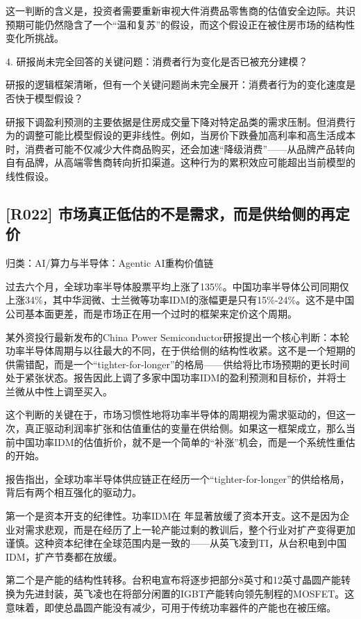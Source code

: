 \documentclass[11pt]{ctexart}
\begin{document}
这一判断的含义是，投资者需要重新审视大件消费品零售商的估值安全边际。共识预期可能仍然隐含了一个“温和复苏”的假设，而这个假设正在被住房市场的结构性变化所挑战。

4. 研报尚未完全回答的关键问题：消费者行为变化是否已被充分建模？

研报的逻辑框架清晰，但有一个关键问题尚未完全展开：消费者行为的变化速度是否快于模型假设？

研报下调盈利预测的主要依据是住房成交量下降对特定品类的需求压制。但消费行为的调整可能比模型假设的更非线性。例如，当房价下跌叠加高利率和高生活成本时，消费者可能不仅减少大件商品购买，还会加速“降级消费”——从品牌产品转向自有品牌，从高端零售商转向折扣渠道。这种行为的累积效应可能超出当前模型的线性假设。

\subsection{[R022] 市场真正低估的不是需求，而是供给侧的再定价}
{\small\color{refgray}归类：AI/算力与半导体：Agentic AI重构价值链}

过去六个月，全球功率半导体股票平均上涨了135\%。中国功率半导体公司同期仅上涨34\%，其中华润微、士兰微等功率IDM的涨幅更是只有15\%-24\%。这不是中国公司基本面更差，而是市场正在用一个过时的框架来定价这个周期。

某外资投行最新发布的China Power Semiconductor研报提出一个核心判断：本轮功率半导体周期与以往最大的不同，在于供给侧的结构性收紧。这不是一个短期的供需错配，而是一个“tighter-for-longer”的格局——供给将比市场预期的更长时间处于紧张状态。报告因此上调了多家中国功率IDM的盈利预测和目标价，并将士兰微从中性上调至买入。

这个判断的关键在于，市场习惯性地将功率半导体的周期视为需求驱动的，但这一次，真正驱动利润率扩张和估值重估的变量在供给侧。如果这一框架成立，那么当前中国功率IDM的估值折价，就不是一个简单的“补涨”机会，而是一个系统性重估的开始。

报告指出，全球功率半导体供应链正在经历一个“tighter-for-longer”的供给格局，背后有两个相互强化的驱动力。

第一个是资本开支的纪律性。功率IDM在 年显著放缓了资本开支。这不是因为企业对需求悲观，而是在经历了上一轮产能过剩的教训后，整个行业对扩产变得更加谨慎。这种资本纪律在全球范围内是一致的——从英飞凌到TI，从台积电到中国IDM，扩产节奏都在放缓。

第二个是产能的结构性转移。台积电宣布将逐步把部分8英寸和12英寸晶圆产能转换为先进封装，英飞凌也在将部分闲置的IGBT产能转向领先制程的MOSFET。这意味着，即使总晶圆产能没有减少，可用于传统功率器件的产能也在被压缩。
\end{document}
